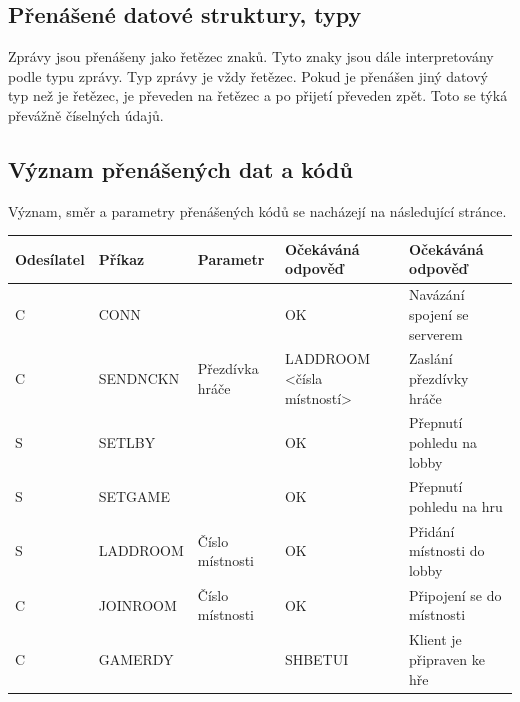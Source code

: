 \documentclass[12pt]{article}
\begin{document}
\subsection{Přenášené datové struktury, typy}
Zprávy jsou přenášeny jako řetězec znaků. Tyto znaky jsou dále interpretovány podle typu zprávy. Typ zprávy je vždy řetězec. Pokud je přenášen jiný datový typ než je řetězec, je převeden na řetězec a po přijetí převeden zpět. Toto se týká převážně číselných údajů.

\subsection{Význam přenášených dat a kódů}
Význam, směr a parametry přenášených kódů se nacházejí na následující stránce.

\begin{table}[]
\begin{tabular}{|l|l|l|p{5.5cm}|p{3cm}|}
\hline
\textbf{Odesílatel} & \textbf{Příkaz} & \textbf{Paramet}r        & \textbf{Očekáváná odpověď} & \textbf{Očekáváná odpověď                                                       } \\ \hline
C          & CONN            &                 & OK                                                                & Navázání spojení se serverem                        \\ \hline
C          & SENDNCKN        & Přezdívka hráče & LADDROOM \textless{}čísla~ místností\textgreater{}                  & Zaslání přezdívky hráče                             \\ \hline
S          & SETLBY          &                 & OK                                                                & Přepnutí pohledu na lobby                           \\ \hline
S          & SETGAME         &                 & OK                                                                & Přepnutí pohledu na hru                             \\ \hline
S          & LADDROOM        & Číslo místnosti & OK                                                                & Přidání místnosti do lobby                          \\ \hline
C          & JOINROOM        & Číslo místnosti & OK                                                                & Připojení se do místnosti                           \\ \hline
C          & GAMERDY         &                 & SHBETUI                                                           & Klient je připraven ke hře                          \\ \hline

\end{tabular}
\end{table}
\end{document}

